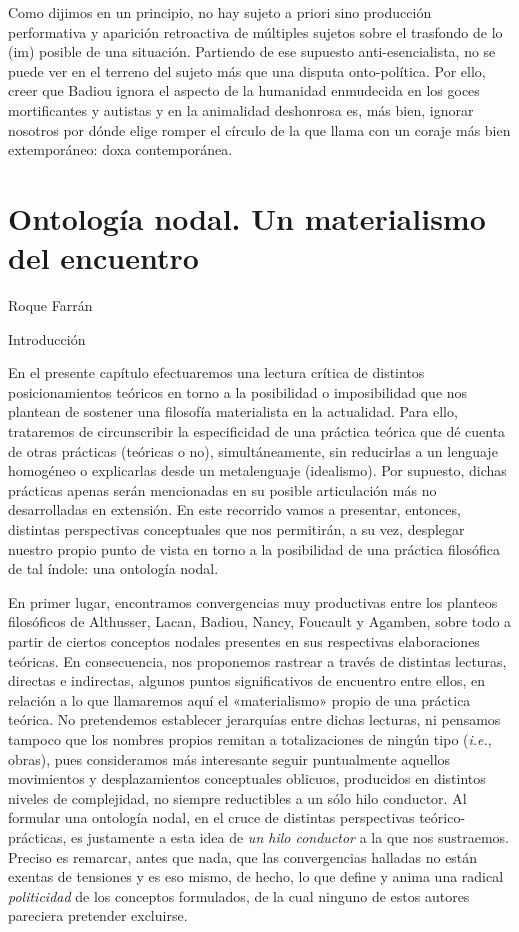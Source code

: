Como dijimos en un principio, no hay sujeto a priori sino producción performativa y aparición retroactiva de múltiples sujetos sobre el trasfondo de lo (im) posible de una situación. Partiendo de ese supuesto anti-esencialista, no se puede ver en el terreno del sujeto más que una disputa onto-política. Por ello, creer que Badiou ignora el aspecto de la humanidad enmudecida en los goces mortificantes y autistas y en la animalidad deshonrosa es, más bien, ignorar nosotros por dónde elige romper el círculo de la que llama con un coraje más bien extemporáneo: doxa contemporánea.

\chapter{Ontología nodal. Un materialismo del encuentro}


Roque Farrán

{Introducción}


En el presente capítulo efectuaremos una lectura crítica de distintos posicionamientos teóricos en torno a la posibilidad o imposibilidad que nos plantean de sostener una filosofía materialista en la actualidad. Para ello, trataremos de circunscribir la especificidad de una práctica teórica que dé cuenta de otras prácticas (teóricas o no), simultáneamente, sin reducirlas a un lenguaje homogéneo o explicarlas desde un metalenguaje (idealismo). Por supuesto, dichas prácticas apenas serán mencionadas en su posible articulación más no desarrolladas en extensión. En este recorrido vamos a presentar, entonces, distintas perspectivas conceptuales que nos permitirán, a su vez, desplegar nuestro propio punto de vista en torno a la posibilidad de una práctica filosófica de tal índole: una ontología nodal.

En primer lugar, encontramos convergencias muy productivas entre los planteos filosóficos de Althusser, Lacan, Badiou, Nancy, Foucault y Agamben, sobre todo a partir de ciertos conceptos nodales presentes en sus respectivas elaboraciones teóricas. En consecuencia, nos proponemos rastrear a través de distintas lecturas, directas e indirectas, algunos puntos significativos de encuentro entre ellos, en relación a lo que llamaremos aquí el «materialismo» propio de una práctica teórica. No pretendemos establecer jerarquías entre dichas lecturas, ni pensamos tampoco que los nombres propios remitan a totalizaciones de ningún tipo (\emph{i.e.}, obras), pues consideramos más interesante seguir puntualmente aquellos movimientos y desplazamientos conceptuales oblicuos, producidos en distintos niveles de complejidad, no siempre reductibles a un sólo hilo conductor. Al formular una ontología nodal, en el cruce de distintas perspectivas teórico-prácticas, es justamente a esta idea de \emph{un hilo conductor} a la que nos sustraemos. Preciso es remarcar, antes que nada, que las convergencias halladas no están exentas de tensiones y es eso mismo, de hecho, lo que define y anima una radical \emph{politicidad} de los conceptos formulados, de la cual ninguno de estos autores pareciera pretender excluirse.

